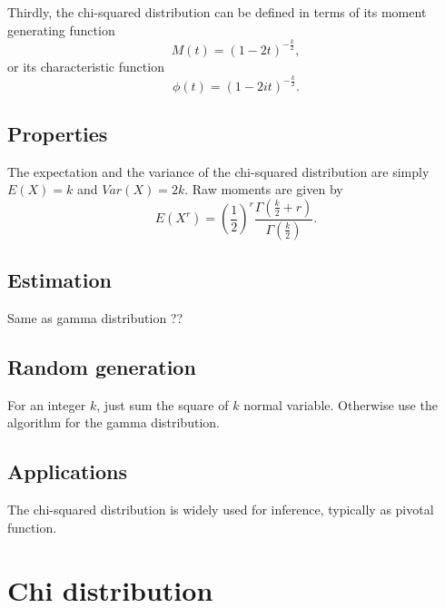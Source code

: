 Thirdly, the chi-squared distribution can be defined in terms of its moment generating function
$$
M(t) = (1-2t)^{-\frac{k}{2}},
$$
or its characteristic function
$$
\phi(t) =(1-2it)^{-\frac{k}{2}}.
$$ 

\subsection{Properties}
The expectation and the variance of the chi-squared distribution are simply
$E(X) = k $ and $Var(X)=2k$. Raw moments are given by
$$
E(X^r) =\left(\frac{1}{2}\right)^r\frac{\Gamma(\frac{k}{2}+r)}{\Gamma(\frac{k}{2})}.
$$


\subsection{Estimation}
Same as gamma distribution ??

\subsection{Random generation}
For an integer $k$, just sum the square of $k$ normal variable. Otherwise use the algorithm for the gamma distribution.

\subsection{Applications}
The chi-squared distribution is widely used for inference, typically as pivotal function.

\newpage
\section{Chi distribution}
